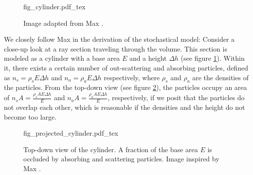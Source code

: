 \begin{figure}
\centering
\def\svgwidth{\columnwidth}
{fig_cylinder.pdf_tex}

\caption{Image adapted from Max \cite{468400}.}
\label{fig:cylinder}
\end{figure}
We closely follow Max\cite{468400} in the derivation of the stochastical model: Consider a close-up look at a ray section traveling through the volume. This section is modeled as a cylinder with a base area $E$ and a height $\Delta h$ (see figure \ref{fig:cylinder}). Within it, there exists a certain number of out-scattering and absorbing particles, defined as $n_s={\rho}_sE{\Delta}h$ and $n_a={\rho}_aE{\Delta}h$ respectively, where ${\rho}_s$ and ${\rho}_a$ are the densities of the particles. From the top-down view (see figure \ref{fig:projected_cylinder}), the particles occupy an area of ${n_sA}=\frac{{\rho}_sAE{\Delta}h}{E}$ and ${n_aA}=\frac{{\rho}_aAE{\Delta}h}{E}$, respectively, if we posit that the particles do not overlap each other, which is reasonable if the densities and the height do not become too large.



\begin{figure}
\centering
\def\svgwidth{\columnwidth}
{fig_projected_cylinder.pdf_tex}

\caption{Top-down view of the cylinder. A fraction of the base area $E$ is occluded by absorbing and scattering particles. Image inspired by Max \cite{468400}.}
\label{fig:projected_cylinder}
\end{figure}

